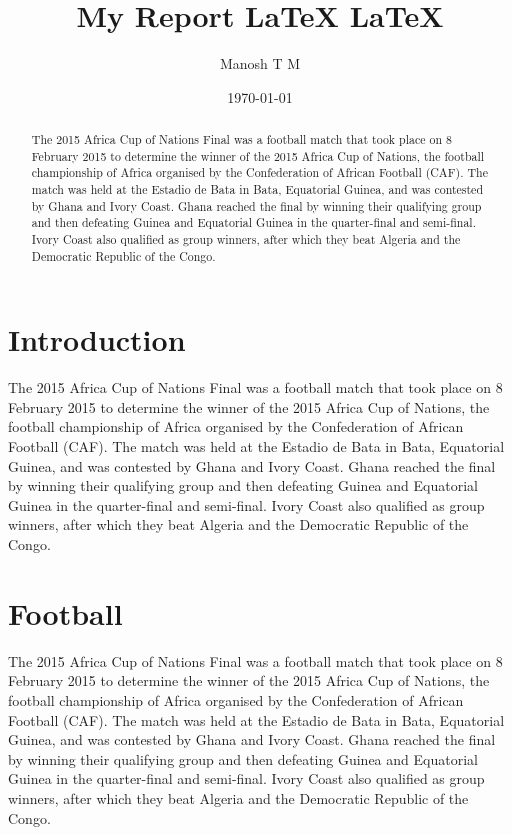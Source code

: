 \documentclass[11pt,a4]{article}
\title{My Report LaTeX \LaTeX}
\author{Manosh T M}
\date{\today}
\begin{document}
\maketitle
\begin{abstract}
	The 2015 Africa Cup of Nations Final was a football match that took place on 8 February 2015 to determine the winner of the 2015 Africa Cup of Nations, the football championship of Africa organised by the Confederation of African Football (CAF). The match was held at the Estadio de Bata in Bata, Equatorial Guinea, and was contested by Ghana and Ivory Coast. Ghana reached the final by winning their qualifying group and then defeating Guinea and Equatorial Guinea in the quarter-final and semi-final. Ivory Coast also qualified as group winners, after which they beat Algeria and the Democratic Republic of the Congo.
\end{abstract}

\section{Introduction}
The 2015 Africa Cup of Nations Final was a football match that took place on 8 February 2015 to determine the winner of the 2015 Africa Cup of Nations, the football championship of Africa organised by the Confederation of African Football (CAF). The match was held at the Estadio de Bata in Bata, Equatorial Guinea, and was contested by Ghana and Ivory Coast. Ghana reached the final by winning their qualifying group and then defeating Guinea and Equatorial Guinea in the quarter-final and semi-final. Ivory Coast also qualified as group winners, after which they beat Algeria and the Democratic Republic of the Congo.

\section*{Football}
The 2015 Africa Cup of Nations Final was a football match that took place on 8 February 2015 to determine the winner of the 2015 Africa Cup of Nations, the football championship of Africa organised by the Confederation of African Football (CAF). The match was held at the Estadio de Bata in Bata, Equatorial Guinea, and was contested by Ghana and Ivory Coast. Ghana reached the final by winning their qualifying group and then defeating Guinea and Equatorial Guinea in the quarter-final and semi-final. Ivory Coast also qualified as group winners, after which they beat Algeria and the Democratic Republic of the Congo.
\end{document}
